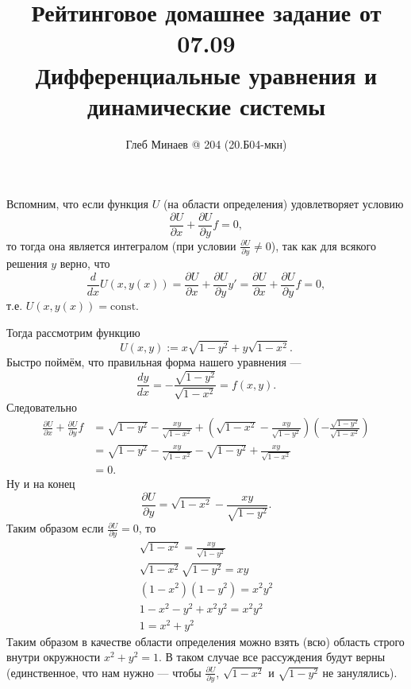\documentclass[12pt,a4paper]{article}
\title{Рейтинговое домашнее задание от 07.09\\Дифференциальные уравнения и динамические системы}
\author{Глеб Минаев @ 204 (20.Б04-мкн)}
\date{}
\newcommand{\const}{\mathrm{const}}
\begin{document}
    \maketitle

    \begin{problem*}[№ 1]
        Вспомним, что если функция $U$ (на области определения) удовлетворяет условию
        \[\frac{\partial U}{\partial x} + \frac{\partial U}{\partial y} f = 0,\]
        то тогда она является интегралом (при условии $\frac{\partial U}{\partial y} \neq 0$), так как для всякого решения $y$ верно, что
        \[
            \frac{d}{dx} U(x, y(x))
            = \frac{\partial U}{\partial x} + \frac{\partial U}{\partial y} y'
            = \frac{\partial U}{\partial x} + \frac{\partial U}{\partial y} f
            = 0,
        \]
        т.е. $U(x, y(x)) = \const$.

        Тогда рассмотрим функцию
        \[U(x, y) := x \sqrt{1 - y^2} + y \sqrt{1 - x^2}.\]
        Быстро поймём, что правильная форма нашего уравнения ---
        \[\frac{dy}{dx} = - \frac{\sqrt{1 - y^2}}{\sqrt{1 - x^2}} = f(x, y).\]
        Следовательно
        \begin{align*}
            \frac{\partial U}{\partial x} + \frac{\partial U}{\partial y} f
            &= \sqrt{1 - y^2} - \frac{xy}{\sqrt{1 - x^2}} + \left(\sqrt{1 - x^2} - \frac{xy}{\sqrt{1 - y^2}}\right) \left(- \frac{\sqrt{1 - y^2}}{\sqrt{1 - x^2}}\right)\\
            &= \sqrt{1 - y^2} - \frac{xy}{\sqrt{1 - x^2}} - \sqrt{1 - y^2} + \frac{xy}{\sqrt{1 - x^2}}\\
            &= 0.
        \end{align*}
        Ну и на конец
        \[\frac{\partial U}{\partial y} = \sqrt{1 - x^2} - \frac{xy}{\sqrt{1 - y^2}}.\]
        Таким образом если $\frac{\partial U}{\partial y} = 0$, то
        \begin{gather*}
            \sqrt{1 - x^2} = \frac{xy}{\sqrt{1 - y^2}}\\
            \sqrt{1 - x^2} \sqrt{1 - y^2} = xy\\
            (1 - x^2) (1 - y^2) = x^2 y^2\\
            1 - x^2 - y^2 + x^2 y^2 = x^2 y^2\\
            1 = x^2 + y^2
        \end{gather*}
        Таким образом в качестве области определения можно взять (всю) область строго внутри окружности $x^2 + y^2 = 1$. В таком случае все рассуждения будут верны (единственное, что нам нужно --- чтобы $\frac{\partial U}{\partial y}$, $\sqrt{1 - x^2}$ и $\sqrt{1 - y^2}$ не занулялись).
    \end{problem*}
\end{document}
